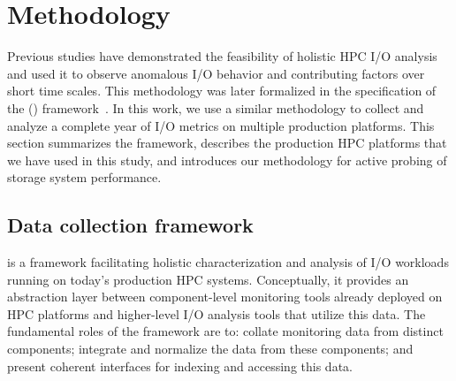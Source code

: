 \section{Methodology}\label{sec:methods}

Previous studies have demonstrated the feasibility of 
holistic HPC I/O analysis and used it to observe anomalous I/O behavior and
contributing factors over short time scales\cite{Lockwood2017}. This methodology was later formalized in the specification of the \tokio (\tokiolong) framework~\cite{Lockwood2018tokio}. 
In this work, we use 
a similar
methodology to collect and analyze a complete
year of I/O metrics on multiple production platforms.  This section
summarizes the \tokio framework, 
describes the production HPC platforms that we have 
used in this study,
and introduces our methodology for active probing of storage system
performance.

\subsection{Data collection framework}\label{sec:methods/tokio}


\tokio is a framework facilitating holistic characterization and analysis of I/O workloads running on today's production HPC systems. Conceptually, it provides an abstraction layer between component-level monitoring tools already deployed on HPC platforms and higher-level I/O analysis tools that utilize this data. The fundamental roles of the \tokio framework are to: collate monitoring data from distinct components; integrate and normalize the data from these components; and present coherent interfaces for indexing and accessing this data.

